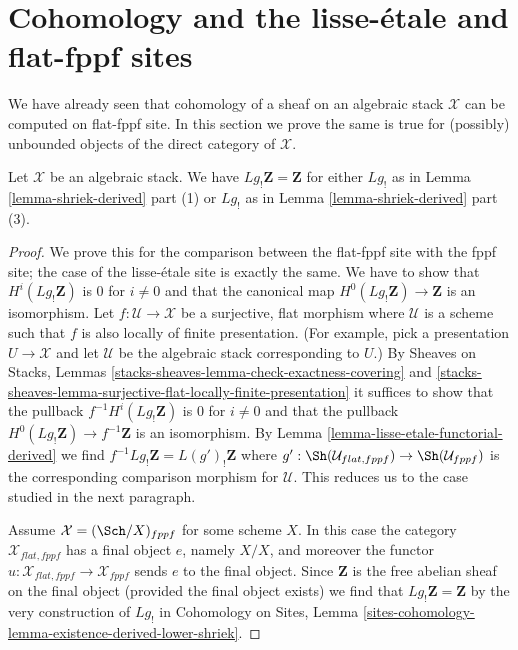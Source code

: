 \section{Cohomology and the lisse-\'etale and flat-fppf sites}
\label{section-compare-unbounded-lisse-etale}

\noindent
We have already seen that cohomology of a sheaf on an algebraic
stack $\mathcal{X}$ can be computed on flat-fppf site. In this
section we prove the same is true for (possibly) unbounded
objects of the direct category of $\mathcal{X}$.

\begin{lemma}
\label{lemma-higher-shriek-Z}
Let $\mathcal{X}$ be an algebraic stack. We have
$Lg_!\mathbf{Z} = \mathbf{Z}$ for either $Lg_!$ as in
Lemma \ref{lemma-shriek-derived} part (1) or $Lg_!$ as in
Lemma \ref{lemma-shriek-derived} part (3).
\end{lemma}

\begin{proof}
We prove this for the comparison between the flat-fppf site with the
fppf site; the case of the lisse-\'etale site is exactly the same.
We have to show that $H^i(Lg_!\mathbf{Z})$ is $0$ for $i \not = 0$
and that the canonical map $H^0(Lg_!\mathbf{Z}) \to \mathbf{Z}$
is an isomorphism. Let $f : \mathcal{U} \to \mathcal{X}$ be a
surjective, flat morphism where $\mathcal{U}$ is a scheme
such that $f$ is also locally of finite presentation.
(For example, pick a presentation $U \to \mathcal{X}$ and
let $\mathcal{U}$ be the algebraic stack corresponding to $U$.)
By Sheaves on Stacks, Lemmas
\ref{stacks-sheaves-lemma-check-exactness-covering} and
\ref{stacks-sheaves-lemma-surjective-flat-locally-finite-presentation}
it suffices to show that the pullback $f^{-1}H^i(Lg_!\mathbf{Z})$
is $0$ for $i \not = 0$ and that the pullback
$H^0(Lg_!\mathbf{Z}) \to f^{-1}\mathbf{Z}$ is an isomorphism.
By Lemma \ref{lemma-lisse-etale-functorial-derived} we find
$f^{-1}Lg_!\mathbf{Z} = L(g')_!\mathbf{Z}$ where
$g' : \Sh(\mathcal{U}_{flat, fppf}) \to \Sh(\mathcal{U}_{fppf})$
is the corresponding comparison morphism for $\mathcal{U}$.
This reduces us to the case studied in the next paragraph.

\medskip\noindent
Assume $\mathcal{X} = (\Sch/X)_{fppf}$ for some scheme $X$.
In this case the category $\mathcal{X}_{flat, fppf}$ has
a final object $e$, namely $X/X$, and moreover the functor
$u : \mathcal{X}_{flat, fppf} \to \mathcal{X}_{fppf}$
sends $e$ to the final object. Since $\mathbf{Z}$ is the
free abelian sheaf on the final object (provided the final
object exists) we find that $Lg_!\mathbf{Z} = \mathbf{Z}$ by
the very construction of $Lg_!$ in Cohomology on Sites,
Lemma \ref{sites-cohomology-lemma-existence-derived-lower-shriek}.
\end{proof}

